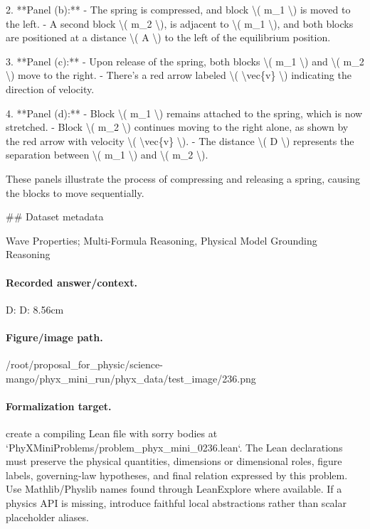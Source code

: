 2. **Panel (b):**
   - The spring is compressed, and block \textbackslash{}( m\_1 \textbackslash{}) is moved to the left.
   - A second block \textbackslash{}( m\_2 \textbackslash{}), is adjacent to \textbackslash{}( m\_1 \textbackslash{}), and both blocks are positioned at a distance \textbackslash{}( A \textbackslash{}) to the left of the equilibrium position.

3. **Panel (c):**
   - Upon release of the spring, both blocks \textbackslash{}( m\_1 \textbackslash{}) and \textbackslash{}( m\_2 \textbackslash{}) move to the right.
   - There's a red arrow labeled \textbackslash{}( \textbackslash{}vec\{v\} \textbackslash{}) indicating the direction of velocity.

4. **Panel (d):**
   - Block \textbackslash{}( m\_1 \textbackslash{}) remains attached to the spring, which is now stretched.
   - Block \textbackslash{}( m\_2 \textbackslash{}) continues moving to the right alone, as shown by the red arrow with velocity \textbackslash{}( \textbackslash{}vec\{v\} \textbackslash{}).
   - The distance \textbackslash{}( D \textbackslash{}) represents the separation between \textbackslash{}( m\_1 \textbackslash{}) and \textbackslash{}( m\_2 \textbackslash{}).

These panels illustrate the process of compressing and releasing a spring, causing the blocks to move sequentially.

\#\# Dataset metadata

Wave Properties; Multi-Formula Reasoning, Physical Model Grounding Reasoning

\paragraph{Recorded answer/context.}
D: D: 8.56cm

\paragraph{Figure/image path.}
/root/proposal\_for\_physic/science-mango/phyx\_mini\_run/phyx\_data/test\_image/236.png

\paragraph{Formalization target.}
create a compiling Lean file with sorry bodies at `PhyXMiniProblems/problem\_phyx\_mini\_0236.lean`. The Lean declarations must preserve the physical quantities, dimensions or dimensional roles, figure labels, governing-law hypotheses, and final relation expressed by this problem.
Use Mathlib/Physlib names found through LeanExplore where available. If a physics API is missing, introduce faithful local abstractions rather than scalar placeholder aliases.

